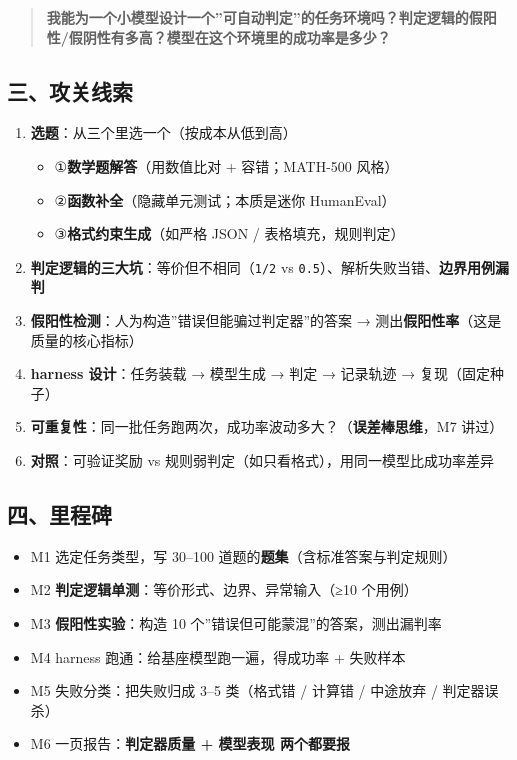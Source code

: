 \documentclass[
  chinese,
  11pt,
]{ctexart}
\providecommand{\tightlist}{%
  \setlength{\itemsep}{0pt}\setlength{\parskip}{0pt}}
\begin{document}
\begin{quote}
\textbf{我能为一个小模型设计一个''可自动判定''的任务环境吗？判定逻辑的假阳性/假阴性有多高？模型在这个环境里的成功率是多少？}
\end{quote}

\subsection{三、攻关线索}\label{ux4e09ux653bux5173ux7ebfux7d22-7}

\begin{enumerate}
\def\labelenumi{\arabic{enumi}.}
\tightlist
\item
  \textbf{选题}：从三个里选一个（按成本从低到高）

  \begin{itemize}
  \tightlist
  \item
    ①\textbf{数学题解答}（用数值比对 + 容错；MATH-500 风格）
  \item
    ②\textbf{函数补全}（隐藏单元测试；本质是迷你 HumanEval）
  \item
    ③\textbf{格式约束生成}（如严格 JSON / 表格填充，规则判定）
  \end{itemize}
\item
  \textbf{判定逻辑的三大坑}：等价但不相同（\texttt{1/2} vs \texttt{0.5}）、解析失败当错、\textbf{边界用例漏判}
\item
  \textbf{假阳性检测}：人为构造''错误但能骗过判定器''的答案 → 测出\textbf{假阳性率}（这是质量的核心指标）
\item
  \textbf{harness 设计}：任务装载 → 模型生成 → 判定 → 记录轨迹 → 复现（固定种子）
\item
  \textbf{可重复性}：同一批任务跑两次，成功率波动多大？（\textbf{误差棒思维}，M7 讲过）
\item
  \textbf{对照}：可验证奖励 vs 规则弱判定（如只看格式），用同一模型比成功率差异
\end{enumerate}

\subsection{四、里程碑}\label{ux56dbux91ccux7a0bux7891-7}

\begin{itemize}
\tightlist
\item[$\square$]
  M1 选定任务类型，写 30--100 道题的\textbf{题集}（含标准答案与判定规则）
\item[$\square$]
  M2 \textbf{判定逻辑单测}：等价形式、边界、异常输入（≥10 个用例）
\item[$\square$]
  M3 \textbf{假阳性实验}：构造 10 个''错误但可能蒙混''的答案，测出漏判率
\item[$\square$]
  M4 harness 跑通：给基座模型跑一遍，得成功率 + 失败样本
\item[$\square$]
  M5 失败分类：把失败归成 3--5 类（格式错 / 计算错 / 中途放弃 / 判定器误杀）
\item[$\square$]
  M6 一页报告：\textbf{判定器质量 + 模型表现 两个都要报}
\end{itemize}
\end{document}
